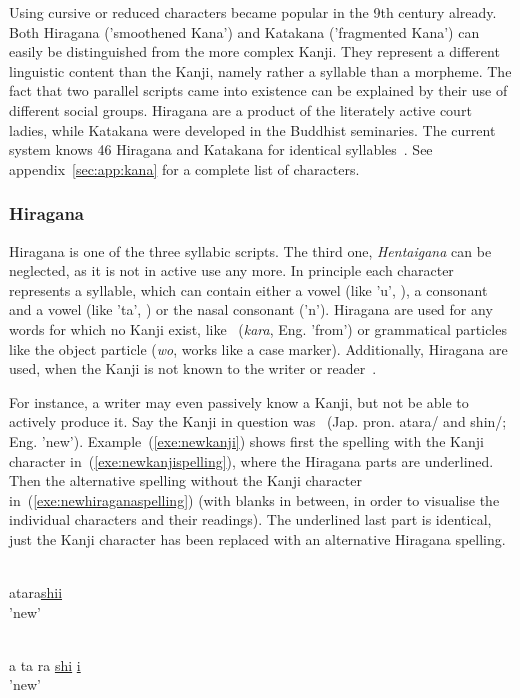 Using cursive or reduced characters became popular in the 9th century already.
Both Hiragana ('smoothened Kana') and Katakana ('fragmented Kana') can easily be 
distinguished from the more complex Kanji. They represent a different linguistic 
content than the Kanji, namely rather a syllable than a morpheme.
The fact that two parallel scripts came into existence can be explained by 
their use of different social groups. Hiragana are a product of the literately 
active court ladies, while Katakana were developed in the Buddhist seminaries.
The current system knows 46 Hiragana and Katakana for identical 
syllables~. See appendix~\ref{sec:app:kana} for a 
complete list of characters.

\subsubsection{Hiragana }
\label{sec:hiragana}

Hiragana is one of the three syllabic scripts. The third one, 
\emph{Hentaigana} can be neglected, as it is not in active use any more. %
In principle each character represents a syllable, which can contain either a 
vowel (like 'u', ), a consonant and a vowel (like 'ta', ) or the 
nasal consonant  ('n').
Hiragana are used for any words for which no Kanji exist, like 
~(\emph{kara}, Eng. 'from') or grammatical particles like the object 
particle  (\emph{wo}, works like a case marker).
Additionally, Hiragana are used, when the Kanji is not known to the writer or 
reader~. 

For instance, a writer may even passively know a Kanji, but not be able
to actively produce it. Say the Kanji in question was ~(Jap. pron. 
atara/ and shin/; Eng. 'new'). Example~(\ref{exe:newkanji})
shows first the spelling with the Kanji character 
in~(\ref{exe:newkanjispelling}), where the Hiragana parts are underlined.
Then the alternative spelling without the Kanji character 
in~(\ref{exe:newhiraganaspelling}) (with blanks in between, in order to visualise
the individual characters and their readings). The underlined last part is 
identical, just the Kanji character has been replaced with an alternative 
Hiragana spelling.
\begin{exe}
\ex \label{exe:newkanji}
\begin{xlist}
\ex \label{exe:newkanjispelling}
\gll {}\underline{} \\
atara\underline{shii} \\
\trans 'new'

\ex \label{exe:newhiraganaspelling}
\gll {}   \underline{} \underline{} \\
a ta ra \underline{shi} \underline{i} \\
\trans 'new'
\end{xlist}
\end{exe}

